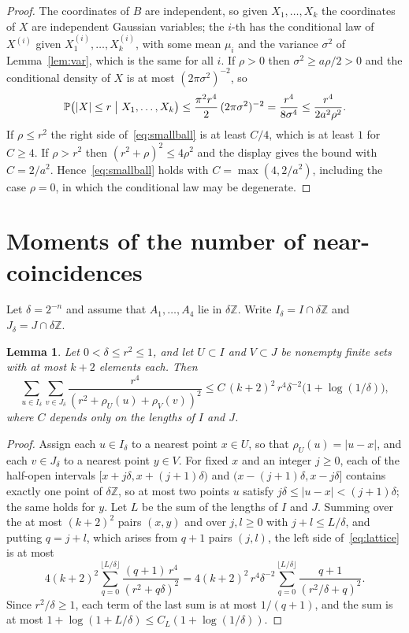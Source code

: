 \documentclass[11pt]{amsart}
\newtheorem{lemma}[theorem]{Lemma}
\theoremstyle{remark}
\newcommand{\Z}{\mathbb{Z}}
\newcommand{\PP}{\mathbb{P}}
\begin{document}
\begin{proof}
The coordinates of $B$ are independent, so given $X_1,\dots,X_k$ the coordinates of $X$ are independent Gaussian
variables; the $i$-th has the conditional law of $X^{(i)}$ given $X^{(i)}_1,\dots,X^{(i)}_k$, with some mean $\mu_i$
and the variance $\sigma^2$ of Lemma~\ref{lem:var}, which is the same for all $i$. If $\rho>0$ then $\sigma^2\ge
a\rho/2>0$ and the conditional density of $X$ is at most $(2\pi\sigma^2)^{-2}$, so
\[
\PP\bigl(|X|\le r\bigm| X_1,\dots,X_k\bigr)\le\frac{\pi^2r^4}{2}\,(2\pi\sigma^2)^{-2}=\frac{r^4}{8\sigma^4}\le
\frac{r^4}{2a^2\rho^2}.
\]
If $\rho\le r^2$ the right side of~\eqref{eq:smallball} is at least $C/4$, which is at least $1$ for $C\ge4$. If
$\rho>r^2$ then $(r^2+\rho)^2\le4\rho^2$ and the display gives the bound with $C=2/a^2$. Hence~\eqref{eq:smallball}
holds with $C=\max(4,2/a^2)$, including the case $\rho=0$, in which the conditional law may be degenerate.
\end{proof}

\section{Moments of the number of near-coincidences}\label{sec:moments}

Let $\delta=2^{-n}$ and assume that $A_1,\dots,A_4$ lie in $\delta\Z$. Write $I_\delta=I\cap\delta\Z$ and
$J_\delta=J\cap\delta\Z$.

\begin{lemma}\label{lem:lattice}
Let $0<\delta\le r^2\le1$, and let $U\subset I$ and $V\subset J$ be nonempty finite sets with at most $k+2$ elements each. Then
\begin{equation}\label{eq:lattice}
\sum_{u\in I_\delta}\sum_{v\in J_\delta}\frac{r^4}{(r^2+\rho_U(u)+\rho_V(v))^2}\le C\,(k+2)^2\,r^4\delta^{-2}
\bigl(1+\log(1/\delta)\bigr),
\end{equation}
where $C$ depends only on the lengths of $I$ and $J$.
\end{lemma}

\begin{proof}
Assign each $u\in I_\delta$ to a nearest point $x\in U$, so that $\rho_U(u)=|u-x|$, and each $v\in J_\delta$ to a
nearest point $y\in V$. For fixed $x$ and an integer $j\ge0$, each of the half-open intervals $[x+j\delta,x+(j+1)\delta)$
and $(x-(j+1)\delta,x-j\delta]$ contains exactly one point of $\delta\Z$, so at most two points $u$ satisfy
$j\delta\le|u-x|<(j+1)\delta$; the same holds for $y$. Let $L$ be the sum of the lengths of $I$ and $J$. Summing over
the at most $(k+2)^2$ pairs $(x,y)$ and over $j,l\ge0$ with $j+l\le L/\delta$, and putting $q=j+l$, which arises from
$q+1$ pairs $(j,l)$, the left side of~\eqref{eq:lattice} is at most
\[
4(k+2)^2\sum_{q=0}^{\lfloor L/\delta\rfloor}\frac{(q+1)\,r^4}{(r^2+q\delta)^2}
=4(k+2)^2\,r^4\delta^{-2}\sum_{q=0}^{\lfloor L/\delta\rfloor}\frac{q+1}{(r^2/\delta+q)^2}.
\]
Since $r^2/\delta\ge1$, each term of the last sum is at most $1/(q+1)$, and the sum is at most
$1+\log(1+L/\delta)\le C_L(1+\log(1/\delta))$.
\end{proof}
\end{document}
